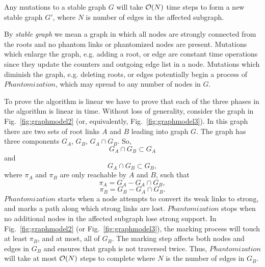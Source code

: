 \begin{theorem}[Termination]
\label{theorem:termination}
Any mutations to a stable graph $G$ will take ${\cal O}(N)$ time steps to form a
new stable graph $G'$, where $N$ is number of edges
in the affected subgraph.
\end{theorem}

\begin{proofs}
By {\it stable graph} we mean a graph in which all nodes are strongly connected
from the roots and no phantom links or phantomized nodes are present. Mutations
which enlarge the graph, e.g. adding a root, or edge are constant time
operations since they update the counters and outgoing edge list in a node.
Mutations which diminish the graph, e.g. deleting roots, or edges potentially
begin a process of $Phantomization$, which may spread to any number of nodes in
$G$.



To prove the algorithm is linear we have to prove that each of the three phases in
the algorithm is linear in time. Without loss of generality, consider the graph
in Fig.~\ref{fig:graphmodel2} (or, equivalently, Fig.~\ref{fig:graphmodel3}). In this graph there are two sets of root links
$A$ and $B$ leading into graph $G$. The graph has three components $G_A$, $G_B$,
$G_A \cap G_B$. So,
$$G_A \cap G_B \subset G_A$$ and
$$G_A \cap G_B \subset G_B,$$
where $\pi_A$ and $\pi_B$ are only reachable  by $A$ and $B$, such that
$$\pi_A = G_A - G_A \cap G_B,$$
$$\pi_B = G_B - G_A \cap G_B.$$
$Phantomization$ starts when a node attempts to convert its weak links to
strong, and marks a path along which strong links are lost. $Phantomization$
stops when no additional nodes in the affected subgraph lose strong
support. In Fig.~\ref{fig:graphmodel2} (or Fig.~\ref{fig:graphmodel3}), the marking process will touch at least
$\pi_B$, and at most, all of $G_B$. The marking step affects both nodes and
edges in $G_B$ and ensures that graph is not traversed twice. Thus, $Phantomization$
will take at most ${\cal O}(N)$ steps to complete where
$N$ is the number of edges in $G_B$.


\end{proofs}
